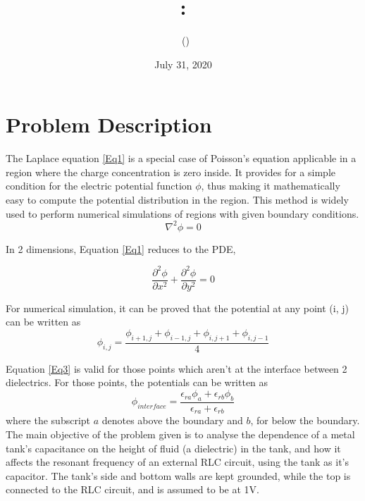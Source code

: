 \documentclass[11pt, a4paper, twoside]{report}
\title{\Huge{\textbf{\courseNumber : \assignmentNumber}}}
\author{\Large{\myName\ (\rollNumber)}}
\date{July 31, 2020}
\begin{document}
\maketitle
    \section{Problem Description}
        The Laplace equation \eqref{Eq1} is a special case of Poisson’s equation applicable in a region where the charge concentration is zero inside. It provides for a simple condition for the electric potential function $\phi$, thus making it mathematically easy to compute the potential distribution in the region. This method is widely used to perform numerical simulations of regions with given boundary conditions.
        \begin{equation}
            \nabla^2\phi = 0
            \label{Eq1}
        \end{equation}

        In 2 dimensions, Equation \eqref{Eq1} reduces to the PDE,

        \begin{equation}
            \frac{\partial^2 \phi}{\partial x^2} + \frac{\partial^2 \phi}{\partial y^2} = 0
        \end{equation}

        For numerical simulation, it can be proved that \cite{Assgn5} the potential at any point (i, j) can be written as
            \begin{equation}
                \phi_{i, j} = \frac{\phi_{i+1, j}+\phi_{i-1, j}+\phi_{i, j+1}+\phi_{i, j-1}}{4}
                \label{Eq3}
            \end{equation}

        Equation \eqref{Eq3} is valid for those points which aren't at the interface between 2 dielectrics. For those points, the potentials can be written as
            \begin{equation}
                \phi_{interface} = \frac{\epsilon_{ra}\phi_a + \epsilon_{rb}\phi_b}{\epsilon_{ra}+\epsilon_{rb}}
                \label{Eq4}
            \end{equation}
        where the subscript $a$ denotes above the boundary and $b$, for below the boundary.\\

        The main objective of the problem given is to analyse the dependence of a metal tank's capacitance on the height of fluid (a dielectric) in the tank, and how it affects the resonant frequency of an external RLC circuit, using the tank as it's capacitor. The tank's side and bottom walls are kept grounded, while the top is connected to the RLC circuit, and is assumed to be at 1V.\\
\end{document}
